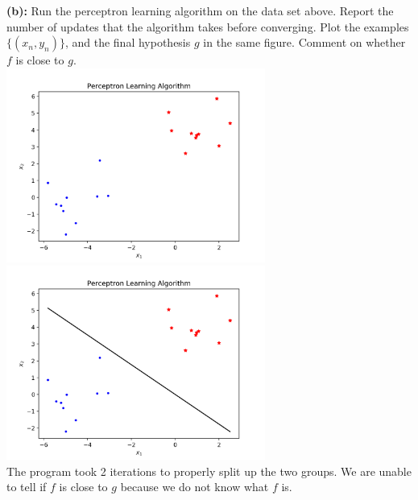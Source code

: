 \documentclass[a4paper]{article}
\begin{document}
\indent \textbf{(b):} Run the perceptron learning algorithm on 
the data set above. Report the number of updates that the algorithm
takes before converging. Plot the examples $\{(x_n,y_n)\}$, and the
final hypothesis $g$ in the same figure. Comment on whether $f$ is 
close to $g$. \\
\includegraphics[width=85mm]{b_1.png} 
\includegraphics[width=85mm]{b_2.png} \\
The program took 2 iterations to properly split up the two groups.
We are unable to tell if $f$ is close to $g$ because we do not know 
what $f$ is. \\ 
\end{document}
